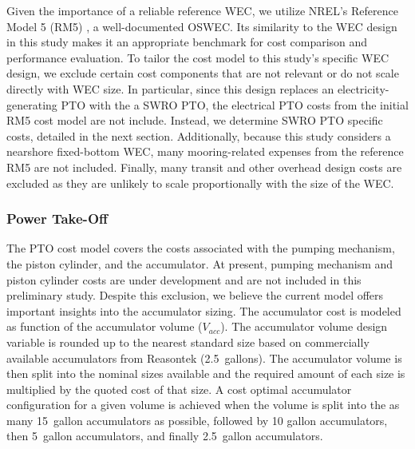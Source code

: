 \documentclass[twocolumn,10pt]{asme2e}
\begin{document}
Given the importance of a reliable reference WEC, we utilize NREL’s Reference Model 5 (RM5) \cite{rm5}, a well-documented OSWEC. Its similarity to the WEC design in this study makes it an appropriate benchmark for cost comparison and performance evaluation. To tailor the cost model to this study’s specific WEC design, we exclude certain cost components that are not relevant or do not scale directly with WEC size. In particular, since this design replaces an electricity-generating PTO with the a SWRO PTO, the electrical PTO costs from the initial RM5 cost model are not include. Instead, we determine SWRO PTO specific costs, detailed in the next section. Additionally, because this study considers a nearshore fixed-bottom WEC, many mooring-related expenses from the reference RM5 are not included. Finally, many transit and other overhead design costs are excluded as they are unlikely to scale proportionally with the size of the WEC. 

\subsubsection{Power Take-Off}

The PTO cost model covers the costs associated with the pumping mechanism, the piston cylinder, and the accumulator. At present, pumping mechanism and piston cylinder costs are under development and are not included in this preliminary study. Despite this exclusion, we believe the current model offers important insights into the accumulator sizing. The accumulator cost is modeled as function of the accumulator volume ($V_{acc}$). The accumulator volume design variable is rounded up to the nearest standard size based on commercially available accumulators from Reasontek \cite{reasontek} (2.5~gallons). The accumulator volume is then split into the nominal sizes available and the required amount of each size is multiplied by the quoted cost of that size. 
A cost optimal accumulator configuration for a given volume is achieved when the volume is split into the as many 15~gallon accumulators as possible, followed by 10 gallon accumulators, then 5~gallon accumulators, and finally 2.5~gallon accumulators.
\end{document}

